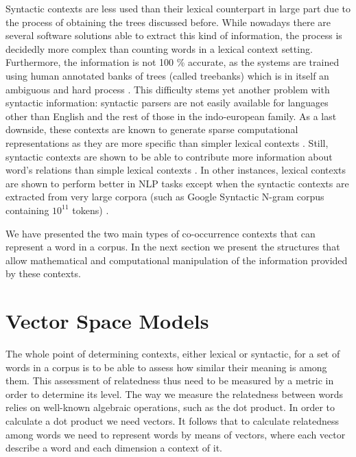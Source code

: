Syntactic contexts are less used than their lexical counterpart in large part due to the process of obtaining the trees discussed before. While nowadays there are several software solutions able to extract this kind of information, the process is decidedly more complex than counting words in a lexical context setting. Furthermore, the information is not 100 \% accurate, as the systems are trained using human annotated banks of trees (called treebanks) which is in itself an ambiguous and hard process \cite{JurafskyM09,perinet2015}.  This difficulty stems yet another problem with syntactic information: syntactic parsers are not easily available for languages other than English and the rest of those in  the indo-european family. As a last downside, these contexts are known to generate sparse computational representations as they are more specific than simpler lexical contexts \cite{sahlgren2006word}. Still, syntactic contexts are shown to be able to contribute more information about word's relations than simple lexical contexts \cite{Lin1997,pado2003constructing,turney2010,baroni2010distributional,LevyG14,Panchenko2017}. In other instances, lexical contexts are shown to perform better in NLP tasks except when the syntactic contexts are extracted from very large corpora (such as Google Syntactic N-gram corpus \cite{goldberg2013dataset} containing $10^{11}$ tokens) \cite{kiela2014systematic}.

We have presented the two  main types of co-occurrence contexts that can represent a word in a corpus. In the next section we present the structures that allow mathematical and computational manipulation of the information provided by these contexts.









\section{Vector Space Models}

The whole point of determining contexts, either lexical or syntactic, for a set of words in a corpus is to be able to assess how similar their meaning is among them. This assessment of relatedness thus need to be measured by a metric in order to determine its level. The way we measure the relatedness between words relies on well-known algebraic operations, such as the dot  product. In order to calculate a dot product we need vectors. It follows that to calculate relatedness among words we need to represent words by means of vectors, where each vector describe a word and each dimension a context of it. 

